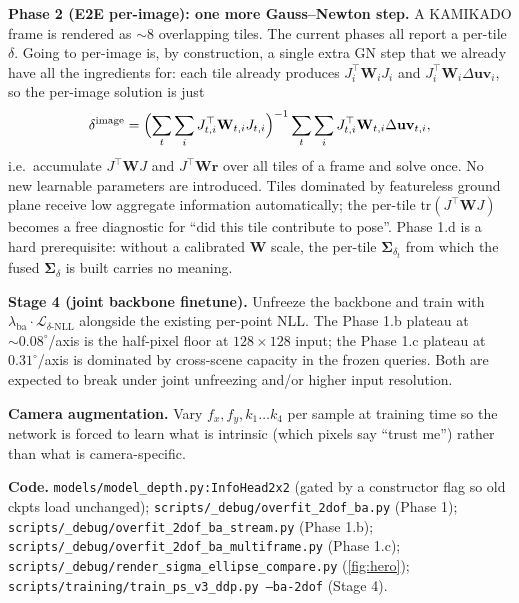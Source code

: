 \documentclass[10pt,conference,a4paper]{IEEEtran}
\newcommand{\Suv}{\Delta\mathbf{uv}}
\newcommand{\W}{\mathbf{W}}
\newcommand{\Sig}{\boldsymbol{\Sigma}}
\begin{document}
\textbf{Phase 2 (E2E per-image): one more Gauss--Newton step.}
A KAMIKADO frame is rendered as $\sim 8$ overlapping tiles. The current
phases all report a per-tile $\delta$. Going to per-image is, by
construction, a single extra GN step that we already have all the
ingredients for: each tile already produces $J_i^\top \W_i J_i$ and
$J_i^\top \W_i \Suv_i$, so the per-image solution is just
%
\begin{equation*}
\delta^{\text{image}}
= \Bigl(\sum_t \sum_i J_{t,i}^\top \W_{t,i} J_{t,i}\Bigr)^{-1}
  \sum_t \sum_i J_{t,i}^\top \W_{t,i} \Suv_{t,i},
\end{equation*}
%
i.e.\ accumulate $J^\top \W J$ and $J^\top \W \mathbf{r}$ over all tiles
of a frame and solve once. No new learnable parameters are introduced.
Tiles dominated by featureless ground plane receive low aggregate
information automatically; the per-tile $\mathrm{tr}(J^\top\W J)$
becomes a free diagnostic for ``did this tile contribute to pose''.
Phase 1.d is a hard prerequisite: without a calibrated $\W$ scale, the
per-tile $\Sig_{\delta_t}$ from which the fused $\Sig_{\delta}$ is
built carries no meaning.

\textbf{Stage 4 (joint backbone finetune).} Unfreeze the backbone and
train with $\lambda_{\mathrm{ba}}\!\cdot\!\mathcal{L}_{\delta\text{-NLL}}$
alongside the existing per-point NLL. The Phase 1.b plateau at
$\sim 0.08^\circ$/axis is the half-pixel floor at $128\times 128$
input; the Phase 1.c plateau at $0.31^\circ$/axis is dominated by
cross-scene capacity in the frozen queries. Both are expected to break
under joint unfreezing and/or higher input resolution.

\textbf{Camera augmentation.} Vary $f_x, f_y, k_1\ldots k_4$ per
sample at training time so the network is forced to learn what is
intrinsic (which pixels say ``trust me'') rather than what is
camera-specific.

\textbf{Code.}
\texttt{models/model\_depth.py:InfoHead2x2} (gated by a constructor
flag so old ckpts load unchanged);
\texttt{scripts/\_debug/overfit\_2dof\_ba.py} (Phase 1);
\texttt{scripts/\_debug/overfit\_2dof\_ba\_stream.py} (Phase 1.b);
\texttt{scripts/\_debug/overfit\_2dof\_ba\_multiframe.py} (Phase 1.c);
\texttt{scripts/\_debug/render\_sigma\_ellipse\_compare.py}
(\cref{fig:hero});
\texttt{scripts/training/train\_ps\_v3\_ddp.py --ba-2dof} (Stage 4).
\end{document}
